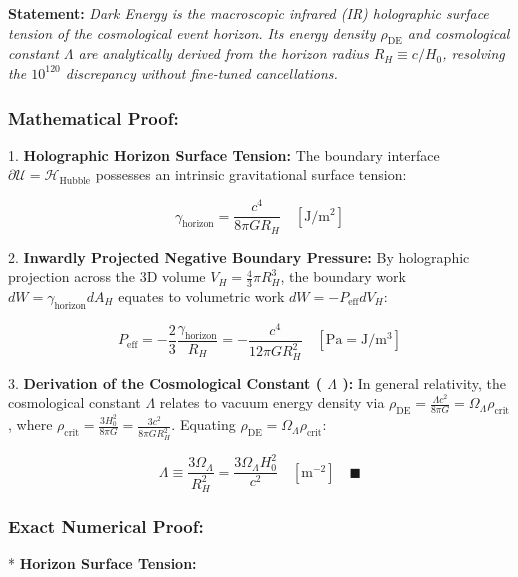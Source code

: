 \documentclass[11pt,a4paper]{article}
\theoremstyle{definition}
\theoremstyle{remark}
\begin{document}
\textbf{Statement:} \textit{Dark Energy is the macroscopic infrared (IR) holographic surface tension of the cosmological event horizon. Its energy density $\rho_{\text{DE}}$ and cosmological constant $\Lambda$ are analytically derived from the horizon radius $R_H \equiv c/H_0$, resolving the $10^{120}$ discrepancy without fine-tuned cancellations.}

\subsubsection{Mathematical Proof:}
1. \textbf{Holographic Horizon Surface Tension:}
The boundary interface $\partial \mathcal{U} = \mathcal{H}_{\text{Hubble}}$ possesses an intrinsic gravitational surface tension:


\begin{equation}
\gamma_{\text{horizon}} = \frac{c^4}{8\pi G R_H} \quad [\mathrm{J/m^2}]
\end{equation}


2. \textbf{Inwardly Projected Negative Boundary Pressure:}
By holographic projection across the 3D volume $V_H = \frac{4}{3}\pi R_H^3$, the boundary work $dW = \gamma_{\text{horizon}} dA_H$ equates to volumetric work $dW = -P_{\text{eff}} dV_H$:


\begin{equation}
P_{\text{eff}} = -\frac{2}{3} \frac{\gamma_{\text{horizon}}}{R_H} = -\frac{c^4}{12\pi G R_H^2} \quad [\mathrm{Pa} = \mathrm{J/m^3}]
\end{equation}


3. \textbf{Derivation of the Cosmological Constant ( $\Lambda$ ):}
In general relativity, the cosmological constant $\Lambda$ relates to vacuum energy density via $\rho_{\text{DE}} = \frac{\Lambda c^2}{8\pi G} = \Omega_\Lambda \rho_{\text{crit}}$, where $\rho_{\text{crit}} = \frac{3 H_0^2}{8\pi G} = \frac{3 c^2}{8\pi G R_H^2}$.
Equating $\rho_{\text{DE}} = \Omega_\Lambda \rho_{\text{crit}}$:


\begin{equation}
\boxed{\Lambda \equiv \frac{3 \Omega_\Lambda}{R_H^2} = \frac{3 \Omega_\Lambda H_0^2}{c^2} \quad [\mathrm{m^{-2}}] \quad \blacksquare}
\end{equation}


\subsubsection{Exact Numerical Proof:}
* \textbf{Horizon Surface Tension:}
\end{document}
